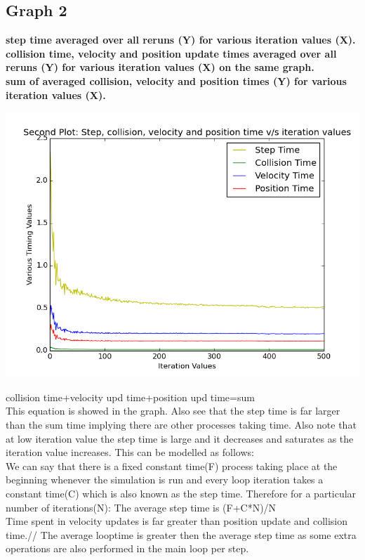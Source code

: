 \documentclass[11pt]{article}
\begin{document}
\subsection{Graph 2}
\textbf{step time averaged over all reruns (Y) for various iteration values (X).}\\
\textbf{collision time, velocity and position update times averaged over all reruns (Y) for various iteration values (X) on the same graph.}\\
\textbf{sum of averaged collision, velocity and position times (Y) for various iteration values (X).}\\
\begin{center}
		\includegraphics[scale=0.5]{g10_project_plot02}
\end{center}
collision time+velocity upd time+position upd time=sum\\
This equation is showed in the graph. Also see that the step time is far larger than the sum time implying there are other processes taking time. Also note that at low iteration value the step time is large and it decreases and saturates as the iteration value increases. This can be modelled as follows:\\
We can say that there is a fixed constant time(F) process taking place at the beginning whenever the simulation is run and every loop iteration takes a constant time(C) which is also known as the step time. Therefore for a particular number of iterations(N): The average step time is (F+C*N)/N \\
Time spent in velocity updates is far greater than position update and collision time.//
The average looptime is greater then the average step time as some extra operations are also performed in the main loop per step. 
\end{document}
